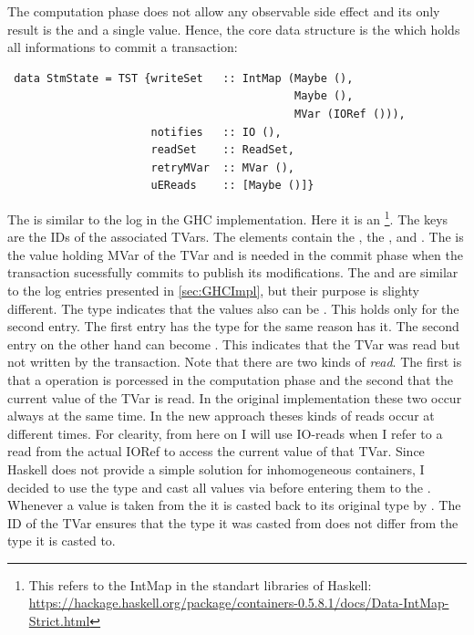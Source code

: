 The computation phase does not allow any observable side effect and its only result is the  and 
a single value.
Hence, the core data structure is the  which holds all informations to commit a transaction:
\begin{lstlisting}
 data StmState = TST {writeSet   :: IntMap (Maybe (),
                                            Maybe (),
                                            MVar (IORef ())),
                      notifies   :: IO (),
                      readSet    :: ReadSet,
                      retryMVar  :: MVar (),
                      uEReads    :: [Maybe ()]}
\end{lstlisting}
The  is similar to the log in the GHC implementation. Here it is an  
\footnote{This refers to the IntMap in the standart libraries of Haskell: \url{https://hackage.haskell.org/package/containers-0.5.8.1/docs/Data-IntMap-Strict.html}}. 
The keys are the IDs of the associated TVars. The elements contain the ,
the , and . The  is the value holding MVar of the TVar and is needed in the commit
phase when the transaction sucessfully commits to publish its modifications. The  
and  are similar to the log entries presented in \ref{sec:GHCImpl}, but their purpose is slighty 
different. The  type indicates that the values also can be . This holds
only for the second entry. The first entry has the  type for the same reason 
 has it. The second entry on the other hand can become . This indicates
that the TVar was read but not written by the transaction. Note that there are two kinds of 
\textit{read}. The first is that a  operation is porcessed in the computation phase
and the second that the current value of the TVar is read. In the original implementation these 
two occur always at the same time. In the new approach theses kinds of reads occur at different times.
For clearity, from here on I will use IO-reads when I refer to a read from the actual IORef to access
the current value of that TVar. Since Haskell does not provide a simple solution for inhomogeneous
containers, I decided to use the type \code{()} and cast all values via  before
entering them to the . Whenever a value is taken from the  it
is casted back to its original type by . The ID of the TVar ensures that 
the type it was casted from does not differ from the type it is casted to.

